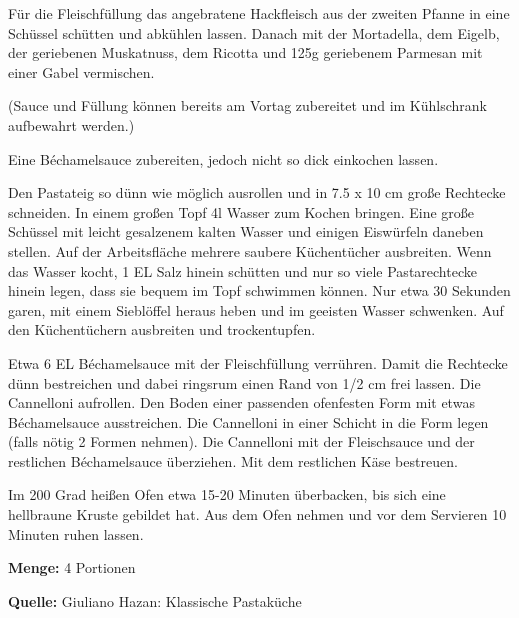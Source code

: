 {Für die Fleischfüllung das angebratene Hackfleisch aus der zweiten Pfanne in eine Schüssel schütten und abkühlen lassen. Danach mit der Mortadella, dem Eigelb, der geriebenen Muskatnuss, dem Ricotta und 125g geriebenem Parmesan mit einer Gabel vermischen.

(Sauce und Füllung können bereits am Vortag zubereitet und im Kühlschrank aufbewahrt werden.)

Eine Béchamelsauce zubereiten, jedoch nicht so dick einkochen lassen.

Den Pastateig so dünn wie möglich ausrollen und in 7.5 x 10 cm große Rechtecke schneiden. In einem großen Topf 4l Wasser zum Kochen bringen. Eine große Schüssel mit leicht gesalzenem kalten Wasser und einigen Eiswürfeln daneben stellen. Auf der Arbeitsfläche mehrere saubere Küchentücher ausbreiten. Wenn das Wasser kocht, 1 EL Salz hinein schütten und nur so viele Pastarechtecke hinein legen, dass sie bequem im Topf schwimmen können. Nur etwa 30 Sekunden garen, mit einem Sieblöffel heraus heben und im geeisten Wasser schwenken. Auf den Küchentüchern ausbreiten und trockentupfen.

Etwa 6 EL Béchamelsauce mit der Fleischfüllung verrühren. Damit die Rechtecke dünn bestreichen und dabei ringsrum einen Rand von 1/2 cm frei lassen. Die Cannelloni aufrollen.
Den Boden einer passenden ofenfesten Form mit etwas Béchamelsauce ausstreichen. Die Cannelloni in einer Schicht in die Form legen (falls nötig 2 Formen nehmen). Die Cannelloni mit der Fleischsauce und der restlichen Béchamelsauce überziehen. Mit dem restlichen Käse bestreuen.

Im 200 Grad heißen Ofen etwa 15-20 Minuten überbacken, bis sich eine hellbraune Kruste gebildet hat. Aus dem Ofen nehmen und vor dem Servieren 10 Minuten ruhen lassen.


{\bfseries Menge:} 4 Portionen

{\bfseries Quelle:} Giuliano Hazan: Klassische Pastaküche 

} 

